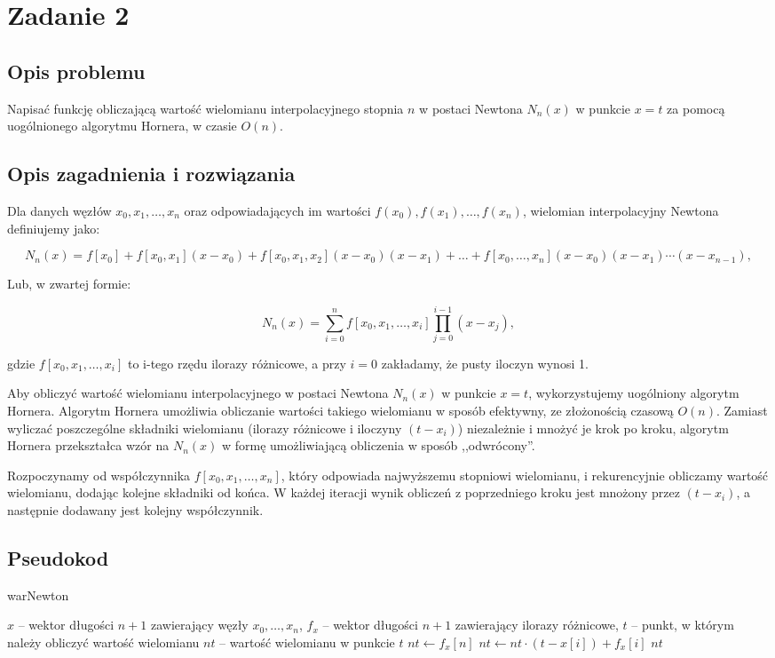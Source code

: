 \documentclass{article}
\begin{document}
\section{Zadanie 2}
\subsection{Opis problemu}
Napisać funkcję obliczającą wartość wielomianu interpolacyjnego stopnia \(n\) w postaci Newtona \(N_n(x)\) w punkcie \(x = t\) za pomocą uogólnionego algorytmu Hornera, w czasie \(O(n)\).

\subsection{Opis zagadnienia i rozwiązania}
Dla danych węzłów \(x_0, x_1, \dots, x_n\) oraz odpowiadających im wartości \(f(x_0), f(x_1), \dots, f(x_n)\), wielomian interpolacyjny Newtona definiujemy jako:

\[
N_n(x) = f[x_0] + f[x_0, x_1](x - x_0) + f[x_0, x_1, x_2](x - x_0)(x - x_1) + \dots + f[x_0, \dots, x_n](x - x_0)(x - x_1)\cdots(x - x_{n-1}),
\]

\noindent Lub, w zwartej formie:

\[
N_n(x) = \sum_{i=0}^n f[x_0, x_1, \dots, x_i] \prod_{j=0}^{i-1} (x - x_j),
\]

gdzie \( f[x_0, x_1, \dots, x_i] \) to i-tego rzędu ilorazy różnicowe, a przy \( i = 0 \) zakładamy, że pusty iloczyn wynosi 1.

Aby obliczyć wartość wielomianu interpolacyjnego w postaci Newtona \( N_n(x) \) w punkcie \( x = t \), wykorzystujemy uogólniony algorytm Hornera.
Algorytm Hornera umożliwia obliczanie wartości takiego wielomianu w sposób efektywny, ze złożonością czasową \( O(n) \).
Zamiast wyliczać poszczególne składniki wielomianu (ilorazy różnicowe i iloczyny $(t - x_i)$) niezależnie i mnożyć je krok po kroku, algorytm Hornera przekształca wzór na $N_n(x)$ w formę umożliwiającą obliczenia w sposób ,,odwrócony''.

Rozpoczynamy od współczynnika $f[x_0, x_1, \dots, x_n]$, który odpowiada najwyższemu stopniowi wielomianu, i rekurencyjnie obliczamy wartość wielomianu, dodając kolejne składniki od końca.
W każdej iteracji wynik obliczeń z poprzedniego kroku jest mnożony przez $(t - x_i)$, a następnie dodawany jest kolejny współczynnik.

\subsection{Pseudokod}
\begin{algorithm}[H]
\caption{warNewton}
\begin{algorithmic}[1]
\Require $x$ -- wektor długości $n + 1$ zawierający węzły $x_0, \dots, x_n$, $f_x$ -- wektor długości $n + 1$ zawierający ilorazy różnicowe, $t$ -- punkt, w którym należy obliczyć wartość wielomianu
\Ensure $nt$ -- wartość wielomianu w punkcie $t$
\State $nt \gets f_x[n]$
    \State $nt \gets nt \cdot (t - x[i]) + f_x[i]$
\EndFor
\State \Return $nt$
\end{algorithmic}
\end{algorithm}
\end{document}
